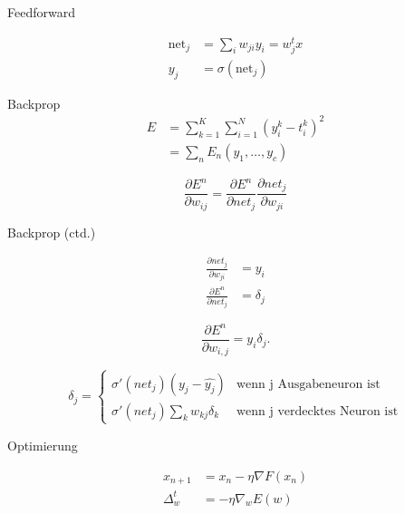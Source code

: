 \documentclass[10pt, compress, xetex]{beamer}
\begin{document}
\begin{frame}{Feedforward}
\begin{figure}[ht!]
  \centering
\end{figure}

\begin{align}
	\text{net}_j & = \sum_{i} w_{ji} y_i = w_j^t x \\
	y_j & = \sigma (\text{net}_j)
\end{align} 
\end{frame}

\begin{frame}{Backprop}
\begin{align}
	E &= \sum_{k=1}^K \sum_{i=1}^N \left( y_i^k - t_i^k \right)^2 \\
	  &=  \sum_n E_n(y_1, \ldots, y_c)
\end{align}

\begin{equation}
\frac{\partial E^n}{\partial w_{ij}} = \frac{\partial E^n}{\partial net_j}  \frac{\partial net_j }{\partial w_{ji}}
\end{equation}

\end{frame}

\begin{frame}{Backprop (ctd.)}


\begin{align}
  \frac{\partial net_j }{\partial w_{ji}} & =  y_i
  \\
  \frac{\partial E^n}{\partial net_j} & =  \delta_j
\end{align}

\begin{equation}
\label{eq:evaluate}
  \frac{\partial E^n}{\partial w_{i,j}} = y_i  \delta_j.
\end{equation}

\begin{equation}
\label{eq:backpropagation}
\delta_j =  \begin{cases}
               \sigma ' (net_j) (y_j - \hat{y_j})           & \text{wenn j Ausgabeneuron ist}\\
               \sigma ' (net_j) \sum_k w_{kj} \delta_k     & \text{wenn j verdecktes Neuron ist}
           \end{cases} 
\end{equation} 
\end{frame}
\begin{frame}{Optimierung}

\begin{align}
x_{n+1} &=x_n- \eta  \nabla F(x_n) \\
\Delta_w^t &= - \eta  \nabla_w E(w)
\end{align}

\end{frame}
\end{document}
